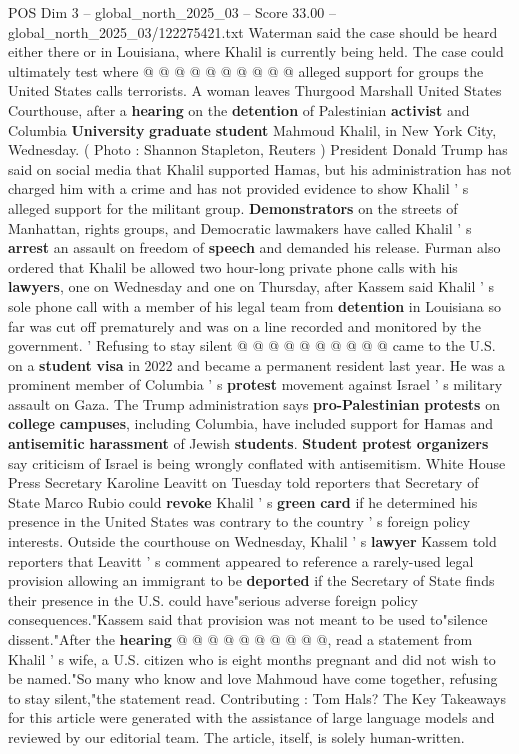 \begin{textsample}{POS Dim 3 – global\_north\_2025\_03 – Score 33.00 – global\_north\_2025\_03/122275421.txt}
Waterman said the case should be heard either there or in Louisiana, where Khalil is currently being held.
The case could ultimately test where @ @ @ @ @ @ @ @ @ @ alleged support for groups the United States calls terrorists.
A woman leaves Thurgood Marshall United States Courthouse, after a \textbf{hearing} on the \textbf{detention} of Palestinian \textbf{activist} and Columbia \textbf{University} \textbf{graduate} \textbf{student} Mahmoud Khalil, in New York City, Wednesday. ( Photo : Shannon Stapleton, Reuters ) President Donald Trump has said on social media that Khalil supported Hamas, but his administration has not charged him with a crime and has not provided evidence to show Khalil ' s alleged support for the militant group. \textbf{Demonstrators} on the streets of Manhattan, rights groups, and Democratic lawmakers have called Khalil ' s \textbf{arrest} an assault on freedom of \textbf{speech} and demanded his release.
Furman also ordered that Khalil be allowed two hour-long private phone calls with his \textbf{lawyers}, one on Wednesday and one on Thursday, after Kassem said Khalil ' s sole phone call with a member of his legal team from \textbf{detention} in Louisiana so far was cut off prematurely and was on a line recorded and monitored by the government. ' Refusing to stay silent @ @ @ @ @ @ @ @ @ @ came to the U.S. on a \textbf{student} \textbf{visa} in 2022 and became a permanent resident last year.
He was a prominent member of Columbia ' s \textbf{protest} movement against Israel ' s military assault on Gaza.
The Trump administration says \textbf{pro-Palestinian} \textbf{protests} on \textbf{college} \textbf{campuses}, including Columbia, have included support for Hamas and \textbf{antisemitic} \textbf{harassment} of Jewish \textbf{students}. \textbf{Student} \textbf{protest} \textbf{organizers} say criticism of Israel is being wrongly conflated with antisemitism.
White House Press Secretary Karoline Leavitt on Tuesday told reporters that Secretary of State Marco Rubio could \textbf{revoke} Khalil ' s \textbf{green} \textbf{card} if he determined his presence in the United States was contrary to the country ' s foreign policy interests.
Outside the courthouse on Wednesday, Khalil ' s \textbf{lawyer} Kassem told reporters that Leavitt ' s comment appeared to reference a rarely-used legal provision allowing an immigrant to be \textbf{deported} if the Secretary of State finds their presence in the U.S. could have"serious adverse foreign policy consequences."Kassem said that provision was not meant to be used to"silence dissent."After the \textbf{hearing} @ @ @ @ @ @ @ @ @ @, read a statement from Khalil ' s wife, a U.S. citizen who is eight months pregnant and did not wish to be named."So many who know and love Mahmoud have come together, refusing to stay silent,"the statement read.
Contributing : Tom Hals?
The Key Takeaways for this article were generated with the assistance of large language models and reviewed by our editorial team.
The article, itself, is solely human-written.


\end{textsample}
